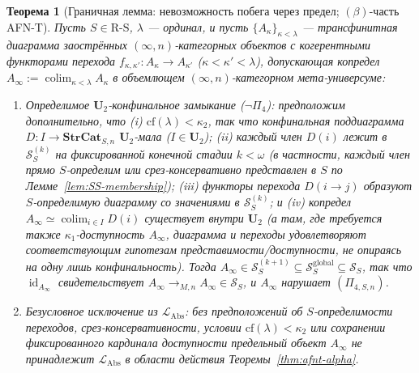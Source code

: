 \documentclass[11pt]{article}
\theoremstyle{plain}
\newtheorem{theorem}{Теорема}[section]
\theoremstyle{definition}
\newcommand{\RS}{\mathrm{R\text{-}S}}
\newcommand{\cS}{\mathcal{S}}
\newcommand{\LAbs}{\mathcal{L}_{\mathrm{Abs}}}
\DeclareMathOperator{\colim}{colim}
\DeclareMathOperator{\id}{id}
\begin{document}
\begin{theorem}[Граничная лемма: невозможность побега через предел; $(\beta)$-часть AFN-T]\label{thm:afnt-beta}
Пусть $S \in \RS$, $\lambda$ — ординал, и пусть $\{A_\kappa\}_{\kappa < \lambda}$ — трансфинитная диаграмма заострённых $(\infty, n)$-категорных объектов с когерентными функторами перехода $f_{\kappa, \kappa'} : A_\kappa \to A_{\kappa'}$ ($\kappa < \kappa' < \lambda$), допускающая копредел $A_\infty := \colim_{\kappa < \lambda} A_\kappa$ в объемлющем $(\infty, n)$-категорном мета-универсуме:
\begin{enumerate}[nosep,label=(\alph*)]
\item \emph{Определимое $\mathbf{U}_2$-конфинальное замыкание ($\neg\Pi_4$)}: предположим дополнительно, что (i) $\mathrm{cf}(\lambda) < \kappa_2$, так что конфинальная поддиаграмма $D : I \to \mathbf{StrCat}_{S, n}$ $\mathbf{U}_2$-мала ($I \in \mathbf{U}_2$); (ii) каждый член $D(i)$ лежит в $\cS_S^{(k)}$ на фиксированной конечной стадии $k < \omega$ (в частности, каждый член прямо $S$-определим или срез-консервативно представлен в $S$ по Лемме~\ref{lem:SS-membership}); (iii) функторы перехода $D(i \to j)$ образуют $S$-определимую диаграмму со значениями в $\cS_S^{(k)}$; и (iv) копредел $A_\infty \simeq \colim_{i \in I} D(i)$ существует внутри $\mathbf{U}_2$ (а там, где требуется также $\kappa_1$-доступность $A_\infty$, диаграмма и переходы удовлетворяют соответствующим гипотезам представимости/доступности, не опираясь на одну лишь конфинальность). Тогда $A_\infty \in \cS_S^{(k+1)} \subseteq \cS_S^{\mathrm{global}} \subseteq \cS_S$, так что $\id_{A_\infty}$ свидетельствует $A_\infty \to_{M, n} A_\infty \in \cS_S$, и $A_\infty$ нарушает $(\Pi_{4, S, n})$.
\item \emph{Безусловное исключение из $\LAbs$}: без предположений об $S$-определимости переходов, срез-консервативности, условии $\mathrm{cf}(\lambda) < \kappa_2$ или сохранении фиксированного кардинала доступности предельный объект $A_\infty$ не принадлежит $\LAbs$ в области действия Теоремы~\ref{thm:afnt-alpha}.
\end{enumerate}
\end{theorem}
\end{document}
